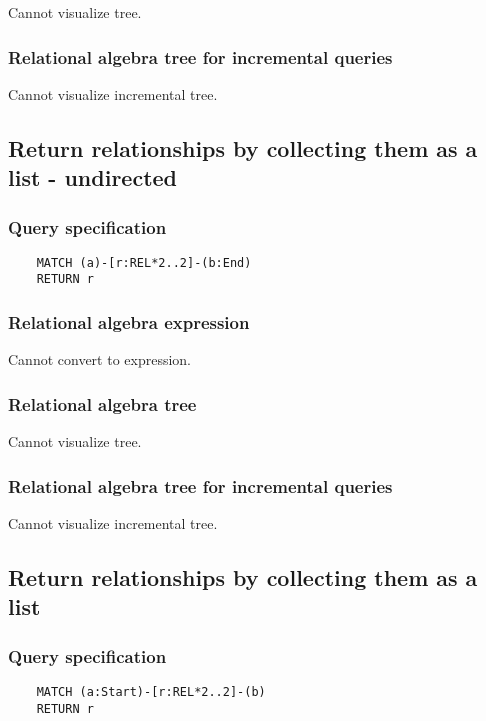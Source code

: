 	Cannot visualize tree.

	\subsubsection*{Relational algebra tree for incremental queries}

	Cannot visualize incremental tree.
	\subsection{Return relationships by collecting them as a list - undirected}

	\subsubsection*{Query specification}

	\begin{lstlisting}
	MATCH (a)-[r:REL*2..2]-(b:End)
	RETURN r
	\end{lstlisting}


	\subsubsection*{Relational algebra expression}

	Cannot convert to expression.

	\subsubsection*{Relational algebra tree}

	Cannot visualize tree.

	\subsubsection*{Relational algebra tree for incremental queries}

	Cannot visualize incremental tree.
	\subsection{Return relationships by collecting them as a list}

	\subsubsection*{Query specification}

	\begin{lstlisting}
	MATCH (a:Start)-[r:REL*2..2]-(b)
	RETURN r
	\end{lstlisting}


